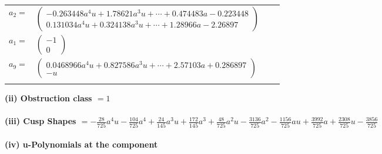 \documentclass[1p]{elsarticle_modified}
\theoremstyle{definition}
\begin{document}
\begin{tabular}{m{7pt} m{180pt} m{7pt} m{180pt} }
\flushright $a_{2}=$&$\begin{pmatrix}-0.263448 a^{4} u+1.78621 a^{3} u+\cdots+0.474483 a-0.223448\\0.131034 a^{4} u+0.324138 a^{3} u+\cdots+1.28966 a-2.26897\end{pmatrix}$ \\
\flushright $a_{1}=$&$\begin{pmatrix}-1\\0\end{pmatrix}$ \\
\flushright $a_{9}=$&$\begin{pmatrix}0.0468966 a^{4} u+0.827586 a^{3} u+\cdots+2.57103 a+0.286897\\- u\end{pmatrix}$\\&\end{tabular}
\flushleft \textbf{(ii) Obstruction class $= 1$}\\~\\
\flushleft \textbf{(iii) Cusp Shapes $= -\frac{28}{725} a^4 u-\frac{104}{725} a^4+\frac{24}{145} a^3 u+\frac{172}{145} a^3+\frac{48}{725} a^2 u-\frac{3136}{725} a^2-\frac{1156}{725} a u+\frac{3992}{725} a+\frac{2308}{725} u-\frac{3856}{725}$}\\~\\
\newpage\renewcommand{\arraystretch}{1}
\flushleft \textbf{(iv) u-Polynomials at the component}\newline \\
\end{document}
